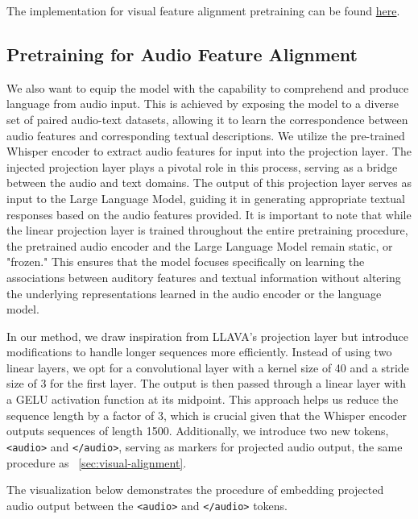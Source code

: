 \documentclass[preprint]{article}
\begin{document}
The implementation for visual feature alignment pretraining can be found \href{https://github.com/mesolitica/multimodal-LLM/tree/master/vision-only}{here}.

\subsection{Pretraining for Audio Feature Alignment}\label{sec:audio-alignment}

We also want to equip the model with the capability to comprehend and produce language from audio input. This is achieved by exposing the model to a diverse set of paired audio-text datasets, allowing it to learn the correspondence between audio features and corresponding textual descriptions. We utilize the pre-trained Whisper encoder to extract audio features for input into the projection layer. The injected projection layer plays a pivotal role in this process, serving as a bridge between the audio and text domains. The output of this projection layer serves as input to the Large Language Model, guiding it in generating appropriate textual responses based on the audio features provided. It is important to note that while the linear projection layer is trained throughout the entire pretraining procedure, the pretrained audio encoder and the Large Language Model remain static, or "frozen." This ensures that the model focuses specifically on learning the associations between auditory features and textual information without altering the underlying representations learned in the audio encoder or the language model.

In our method, we draw inspiration from LLAVA's \cite{liu2023visual} projection layer but introduce modifications to handle longer sequences more efficiently. Instead of using two linear layers, we opt for a convolutional layer with a kernel size of 40 and a stride size of 3 for the first layer. The output is then passed through a linear layer with a GELU activation function at its midpoint. This approach helps us reduce the sequence length by a factor of 3, which is crucial given that the Whisper encoder outputs sequences of length 1500. Additionally, we introduce two new tokens, \texttt{<audio>} and \texttt{</audio>}, serving as markers for projected audio output, the same procedure as ~\ref{sec:visual-alignment}.

\newpage

The visualization below demonstrates the procedure of embedding projected audio output between the \texttt{<audio>} and \texttt{</audio>} tokens.
\end{document}
